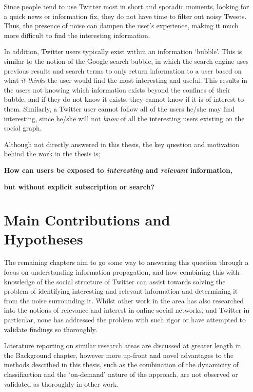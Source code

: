 Since people tend to use Twitter most in short and sporadic moments, looking for a quick news or information fix, they do not have time to filter out noisy Tweets. Thus, the presence of noise can dampen the user's experience, making it much more difficult to find the interesting information.

In addition, Twitter users typically exist within an information `bubble'. This is similar to the notion of the Google search bubble, in which the search engine uses previous results and search terms to only return information to a user based on what \textit{it thinks} the user would find the most interesting and useful. This results in the users not knowing which information exists beyond the confines of their bubble, and if they do not know it exists, they cannot know if it is of interest to them. Similarly, a Twitter user cannot follow all of the users he/she may find interesting, since he/she will not \textit{know} of all the interesting users existing on the social graph.

Although not directly answered in this thesis, the key question and motivation behind the work in the thesis is;\\
\centerline{\textbf{How can users be exposed to \textit{interesting} and \textit{relevant} information,}}
\centerline{\textbf{but without explicit subscription or search?}}


\section{Main Contributions and Hypotheses}
The remaining chapters aim to go some way to answering this question through a focus on understanding information propagation, and how combining this with knowledge of the social structure of Twitter can assist towards solving the problem of identifying interesting and relevant information and determining it from the noise surrounding it. Whilst other work in the area has also researched into the notions of relevance and interest in online social networks, and Twitter in particular, none has addressed the problem with such rigor or have attempted to validate findings so thoroughly.

Literature reporting on similar research areas are discussed at greater length in the Background chapter, however more up-front and novel advantages to the methods described in this thesis, such as the combination of the dynamicity of classifiaction and the `on-demand' nature of the approach, are not observed or validated as thoroughly in other work.  

